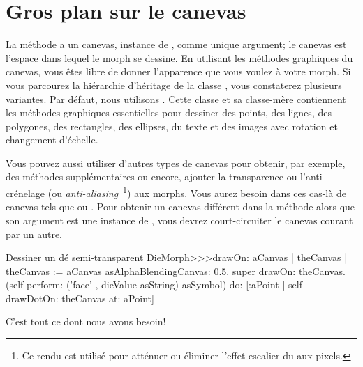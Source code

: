 \documentclass[a4paper,10pt,twoside]{book}
\begin{document}
\section{Gros plan sur le canevas}

La m\'ethode  a un canevas, instance de
, comme unique argument;
le canevas est l'espace dans lequel le morph se dessine.
En utilisant les m\'ethodes graphiques du canevas, vous \^etes libre
de donner l'apparence que vous voulez \`a votre morph.
Si vous parcourez la hi\'erarchie d'h\'eritage de la classe
, vous constaterez plusieurs variantes. Par d\'efaut, nous
utilisons . Cette classe et sa classe-m\`ere
 contiennent les m\'ethodes graphiques essentielles pour
dessiner des points, des lignes, des polygones, des rectangles, des
ellipses, du texte et des images avec rotation et changement d'\'echelle. 

Vous pouvez aussi utiliser d'autres types de canevas pour obtenir, par
exemple, des m\'ethodes suppl\'ementaires ou encore, ajouter la
transparence ou l'anti-cr\'enelage (ou
\emph{anti-aliasing}~\footnote{Ce rendu est utilis\'e pour att\'enuer
  ou \'eliminer l'effet escalier du aux pixels.}) aux morphs.  
Vous aurez besoin dans ces cas-l\`a de canevas tels que
 ou .
Pour obtenir un canevas diff\'erent dans la m\'ethode 
alors que son argument est une instance de , vous devrez
court-circuiter le canevas courant par un autre. 


\begin{method}{Dessiner un d\'e semi-transparent}
DieMorph>>>drawOn: aCanvas
	| theCanvas |
	theCanvas := aCanvas asAlphaBlendingCanvas: 0.5.
	super drawOn: theCanvas.
	(self perform: ('face' , dieValue asString) asSymbol)
		do: [:aPoint | self drawDotOn: theCanvas at: aPoint]
\end{method}
\noindent

C'est tout ce dont nous avons besoin! 
\end{document}

